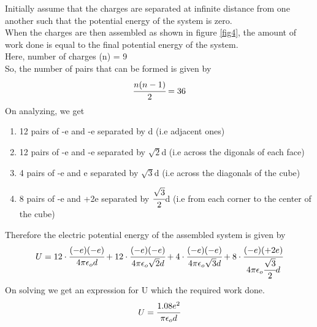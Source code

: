 Initially assume that the charges are separated at infinite distance from one another such that the potential energy of the system is zero.
\\
When the charges are then assembled as shown in figure \ref{fig4}, the amount of work done is equal to the final potential energy of the system. \\
Here, number of charges (n) = 9 \\
So, the number of pairs that can be formed is given by \[\cfrac{n(n-1)}{2} = 36\]
On analyzing, we get
\begin{enumerate}[label=\roman*)]
    \item 12 pairs of -e and -e separated by d (i.e adjacent ones)
    \item 12 pairs of -e and -e separated by $\sqrt{2}$d (i.e across the digonals of each face)
    \item 4 pairs of -e and e separated by $\sqrt{3}$d (i.e across the diagonals of the cube)
    \item 8 pairs of -e and +2e separated by $\cfrac{\sqrt{3}}{2}$d (i.e from each corner to the center of the cube)
\end{enumerate} 
Therefore the electric potential energy of the assembled system is given by \[ U = 12\cdot \cfrac{(-e)(-e)}{4\pi\epsilon_o d} + 12\cdot \cfrac{(-e)(-e)}{4\pi\epsilon_o \sqrt{2}d} + 4\cdot \cfrac{(-e)(-e)}{4\pi\epsilon_o\sqrt{3}d} + 8\cdot \cfrac{(-e)(+2e)}{4\pi\epsilon_o \cfrac{\sqrt{3}}{2}d} \]
On solving we get an expression for U which the required work done. $$U = \cfrac{1.08e^2}{\pi\epsilon_od}$$


